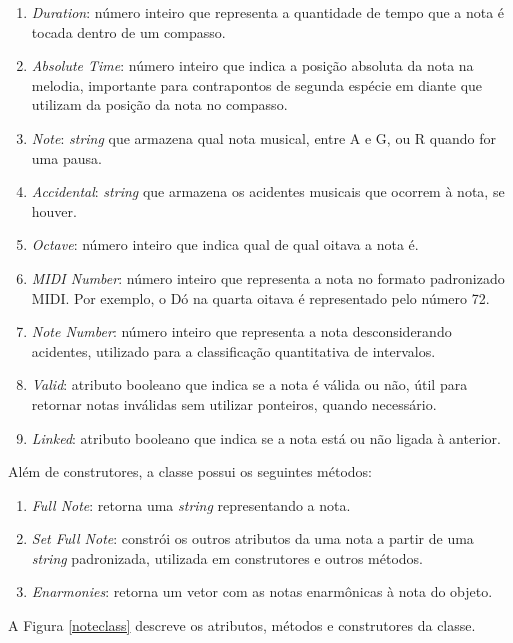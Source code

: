       \begin{enumerate}
        \item \textit{Duration}: número inteiro que representa a quantidade de tempo que a nota é tocada dentro de um compasso.
        \item \textit{Absolute Time}: número inteiro que indica a posição absoluta da nota na melodia, importante para contrapontos de segunda espécie em diante que utilizam da posição da nota no compasso.
        \item \textit{Note}: \textit{string} que armazena qual nota musical, entre A e G, ou R quando for uma pausa.
        \item \textit{Accidental}: \textit{string} que armazena os acidentes musicais que ocorrem à nota, se houver.
        \item \textit{Octave}: número inteiro que indica qual de qual oitava a nota é.
        \item \textit{MIDI Number}: número inteiro que representa a nota no formato padronizado MIDI. Por exemplo, o Dó na quarta oitava é representado pelo número 72.
        \item \textit{Note Number}: número inteiro que representa a nota desconsiderando acidentes, utilizado para a classificação quantitativa de intervalos.
        \item \textit{Valid}: atributo booleano que indica se a nota é válida ou não, útil para retornar notas inválidas sem utilizar ponteiros, quando necessário.
        \item \textit{Linked}: atributo booleano que indica se a nota está ou não ligada à anterior.
      \end{enumerate}

      Além de construtores, a classe possui os seguintes métodos:

      \begin{enumerate}
        \item \textit{Full Note}: retorna uma \textit{string} representando a nota.
        \item \textit{Set Full Note}: constrói os outros atributos da uma nota a partir de uma \textit{string} padronizada, utilizada em construtores e outros métodos.
        \item \textit{Enarmonies}: retorna um vetor com as notas enarmônicas à nota do objeto.
      \end{enumerate}

      A Figura \ref{noteclass} descreve os atributos, métodos e construtores da classe.

